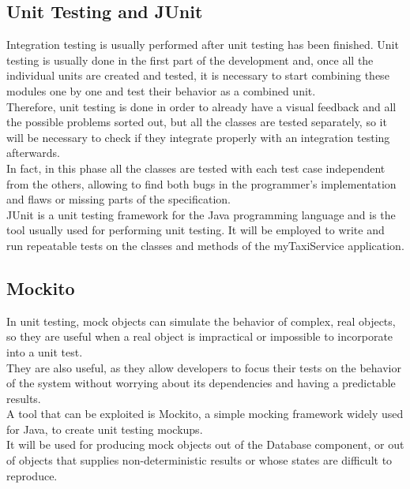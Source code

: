 \documentclass[18pt,oneside,a4paper, titlepage]{article}
\begin{document}
	\subsection{Unit Testing and JUnit}
		Integration testing is usually performed after unit testing has been finished. Unit testing is usually done in the first part of the development and, once all the individual units are created and tested, it is necessary to start combining these modules one by one and test their behavior as a combined unit.\\
		Therefore, unit testing is done in order to already have a visual feedback and all the possible problems sorted out, but all the classes are tested separately, so it will be necessary to check if they integrate properly with an integration testing afterwards.\\
		In fact, in this phase all the classes are tested with each test case independent from the others, allowing to find both bugs in the programmer's implementation and flaws or missing parts of the specification. \\
		JUnit is a unit testing framework for the Java programming language and is the tool usually used for performing unit testing. It will be employed to write and run repeatable tests on the classes and methods of the myTaxiService application.
		
	\subsection{Mockito}
		In unit testing, mock objects can simulate the behavior of complex, real objects, so they are useful when a real object is impractical or impossible to incorporate into a unit test.\\ They are also useful, as they allow developers to focus their tests on the behavior of the system without worrying about its dependencies and having a predictable results.\\
		A tool that can be exploited is Mockito, a simple mocking framework widely used for Java, to create unit testing mockups. \\
		It will be used for producing mock objects out of the Database component, or out of objects that supplies non-deterministic results or whose states are difficult to reproduce.
	
\end{document}
